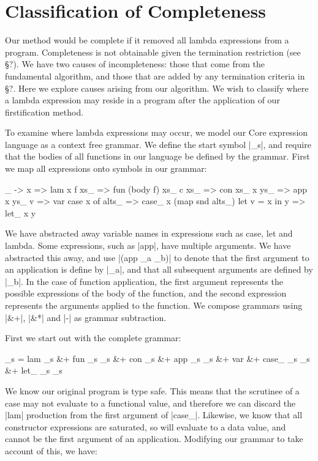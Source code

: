 \documentclass[preprint]{sigplanconf}
\begin{document}
\section{Classification of Completeness}

Our method would be complete if it removed all lambda expressions from a program. Completeness is not obtainable given the termination restriction (see \S?). We have two causes of incompleteness: those that come from the fundamental algorithm, and those that are added by any termination criteria in \S?. Here we explore causes arising from our algorithm. We wish to classify where a lambda expression may reside in a program after the application of our firstification method.

To examine where lambda expressions may occur, we model our Core expression language as a context free grammar. We define the start symbol |_s|, and require that the bodies of all functions in our language be defined by the grammar. First we map all expressions onto symbols in our grammar:

\begin{code}
\vs_ -> x         => lam x
f xs_             => fun (body f) xs_
c xs_             => con xs_
x ys_             => app x ys_
v                 => var
case x of alts_   => case_ x (map snd alts_)
let v = x in y    => let_ x y
\end{code}

We have abstracted away variable names in expressions such as case, let and lambda. Some expressions, such as |app|, have multiple arguments. We have abstracted this away, and use |(app _a _b)| to denote that the first argument to an application is define by |_a|, and that all subsequent arguments are defined by |_b|. In the case of function application, the first argument represents the possible expressions of the body of the function, and the second expression represents the arguments applied to the function. We compose grammars using |&+|, |&*| and |-| as grammar subtraction.

First we start out with the complete grammar:

\begin{code}
_s  =  lam _s &+ fun _s _s &+ con _s &+ app _s _s &+ var &+
       case_ _s _s &+ let_ _s _s
\end{code}

We know our original program is type safe. This means that the scrutinee of a case may not evaluate to a functional value, and therefore we can discard the |lam| production from the first argument of |case_|. Likewise, we know that all constructor expressions are saturated, so will evaluate to a data value, and cannot be the first argument of an application. Modifying our grammar to take account of this, we have:
\end{document}
